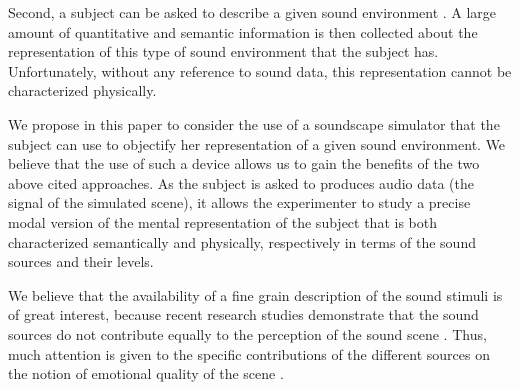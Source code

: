 \documentclass[twoside,twocolumn]{article}
\begin{document}
Second, a subject can be asked to describe a given sound environment \cite{guastavino2006ideal, dubois2006cognitive}. A large amount of quantitative and semantic information is then collected about the representation of this type of sound environment that the subject has. Unfortunately, without any reference to sound data, this representation cannot be characterized physically.


We propose in this paper to consider the use of a soundscape simulator that the subject can use to objectify her representation of a given sound environment. We believe that the use of such a device allows us to gain the benefits of the two above cited approaches. As the subject is asked to produces audio data (the signal of the simulated scene), it allows the experimenter to study a precise modal version of the mental representation of the subject that is both characterized semantically and physically, respectively in terms of the sound sources and their levels.


We believe that the availability of a fine grain description of the sound stimuli is of great interest, because recent research studies demonstrate that the sound sources do not contribute equally to the perception of the sound scene \cite{defreville2004aactivity,lavandier2006contribution,guastavino2006ideal,nilsson2007soundscape,
szeremeta2009analysis}. Thus, much attention is given to the specific contributions of the different sources on the notion of emotional quality of the scene \cite{gozalo2015relationship,ricciardi2015sound}.
\end{document}
